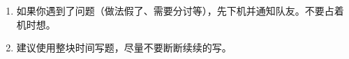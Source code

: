 \begin{enumerate}
    \item 如果你遇到了问题（做法假了、需要分讨等），先下机并通知队友。不要占着机时想。
    \item 建议使用整块时间写题，尽量不要断断续续的写。
\end{enumerate}